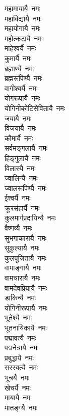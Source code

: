 \begin{flushleft}
\begin{multicols}{2}
महामायायै~नमः\\
महाविद्यायै~नमः\\
महायोगायै~नमः\\
महोत्कटायै~नमः\\
माहेश्वर्यै~नमः\\
कुमार्यै~नमः\\
ब्रह्माण्यै~नमः\\
ब्रह्मरूपिण्यै~नमः\\
वागीश्वर्यै~नमः\\
योगरूपायै~नमः\hfill{}\\
योगिनीकोटिसेवितायै~नमः\\
जयायै~नमः\\
विजयायै~नमः\\
कौमार्यै~नमः\\
सर्वमङ्गलायै~नमः\\
हिङ्गुलायै~नमः\\
विलास्यै~नमः\\
ज्वालिन्यै~नमः\\
ज्वालरूपिण्यै~नमः\\
ईश्वर्यै~नमः\hfill{}\\
क्रूरसंहार्यै~नमः\\
कुलमार्गप्रदायिन्यै~नमः\\
वैष्णव्यै~नमः\\
सुभगाकारायै~नमः\\
सुकुल्यायै~नमः\\
कुलपूजितायै~नमः\\
वामाङ्गायै~नमः\\
वामचारायै~नमः\\
वामदेवप्रियायै~नमः\\
डाकिन्यै~नमः\hfill{}\\
योगिनीरूपायै~नमः\\
भूतेश्यै~नमः\\
भूतनायिकायै~नमः\\
पद्मावत्यै~नमः\\
पद्मनेत्रायै~नमः\\
प्रबुद्धायै~नमः\\
सरस्वत्यै~नमः\\
भूचर्यै~नमः\\
खेचर्यै~नमः\\
मायायै~नमः\hfill{}\\
मातङ्ग्यै~नमः\\

\end{multicols}
\end{flushleft}
